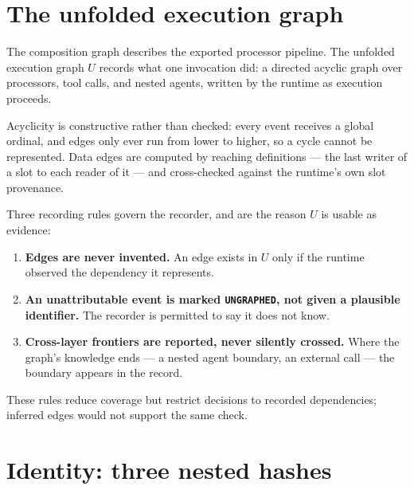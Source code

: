 \section{The unfolded execution graph}
\label{sec:unfolded}

The composition graph describes the exported processor pipeline. The
unfolded execution graph $U$ records what one invocation did: a
directed acyclic graph over processors, tool calls, and nested agents,
written by the runtime as execution proceeds.

Acyclicity is constructive rather than checked: every event receives a
global ordinal, and edges only ever run from lower to higher, so a cycle
cannot be represented. Data edges are computed by reaching definitions ---
the last writer of a slot to each reader of it --- and cross-checked
against the runtime's own slot provenance.

Three recording rules govern the recorder, and are the reason $U$ is usable
as evidence:

\begin{enumerate}
  \item \textbf{Edges are never invented.} An edge exists in $U$ only if
        the runtime observed the dependency it represents.
  \item \textbf{An unattributable event is marked \texttt{UNGRAPHED}, not
        given a plausible identifier.} The recorder is permitted to say it
        does not know.
  \item \textbf{Cross-layer frontiers are reported, never silently
        crossed.} Where the graph's knowledge ends --- a nested agent
        boundary, an external call --- the boundary appears in the record.
\end{enumerate}

These rules reduce coverage but restrict decisions to recorded
dependencies; inferred edges would not support the same check.

\section{Identity: three nested hashes}
\label{sec:identity}

